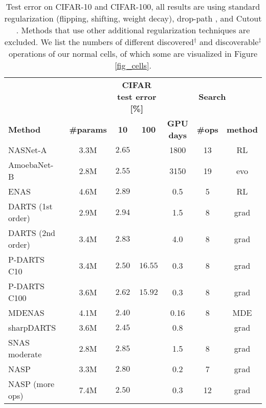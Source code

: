 \documentclass[conference]{IEEEtran}
\begin{document}
\begin{table*}[htbp]
	\caption{Test error on CIFAR-10 and CIFAR-100, all results are using standard regularization (flipping, shifting, weight decay), drop-path \cite{etc_droppath}, and Cutout \cite{etc_cutout}. Methods that use other additional regularization techniques are excluded. We list the numbers of different discovered$^\dagger$ and discoverable$^\ddagger$ operations of our normal cells, of which some are visualized in Figure \ref{fig_cells}.}
	
	\centering
	\begin{center}
		\begin{tabular}{ l  c c c  c c c }
			\toprule
			& & \multicolumn{2}{c}{\textbf{CIFAR test error [\%]}} & \multicolumn{3}{c}{\textbf{Search}} \\
			
			\cmidrule(r){3-4}
			\cmidrule(r){5-7}
			\textbf{Method} & \textbf{\#params} & \textbf{10} & \textbf{100} & \textbf{GPU days} & \textbf{\#ops} & \textbf{method} \\
			\midrule
			NASNet-A~\cite{nas_trans} 			& 3.3M & $2.65$	& $ $	  & 1800 & 13 & RL \\
			AmoebaNet-B~\cite{nas_evo} 			& 2.8M & $2.55$ & $ $	  & 3150 & 19 & evo\\
			ENAS~\cite{nas_enas}				& 4.6M & $2.89$	& $ $	  & 0.5  & 5  & RL \\
			\midrule
			DARTS (1st order)~\cite{nas_darts} 	& 2.9M & $2.94$	& $ $	  & 1.5  & 8  & grad \\
			DARTS (2nd order)~\cite{nas_darts} 	& 3.4M & $2.83$ & $ $	  & 4.0  & 8  & grad \\
			P-DARTS C10~\cite{nas_pdarts} 		& 3.4M & $2.50$	& $16.55$ & 0.3  & 8  & grad \\
			P-DARTS C100~\cite{nas_pdarts} 		& 3.6M & $2.62$	& $15.92$ & 0.3  & 8  & grad \\
			MDENAS~\cite{nas_mde} 				& 4.1M & $2.40$	& $ $	  & 0.16 & 8  & MDE \\
			sharpDARTS~\cite{nas_sharp} 		& 3.6M & $2.45$	& $ $	  & 0.8  &    & grad \\
			SNAS moderate~\cite{nas_snas}	 	& 2.8M & $2.85$	& $ $	  & 1.5  & 8  & grad \\
			NASP~\cite{nas_proximal} 			& 3.3M & $2.80$	& $ $	  & 0.2  & 7  & grad \\
			NASP (more ops)~\cite{nas_proximal}	& 7.4M & $2.50$	& $ $	  & 0.3  & 12 & grad \\
			

\end{tabular}
\end{center}
\end{table*}
\end{document}
